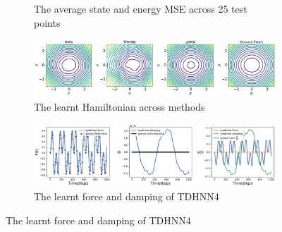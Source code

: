 \documentclass[twoside]{article}
\begin{document}
\begin{figure}[!htb]
\begin{subfigure}[b]{0.48\textwidth}
\caption{The average state and energy MSE across 25 test points}
\end{subfigure}
\begin{subfigure}[b]{0.48\textwidth}
\includegraphics[width=\textwidth]{figures/figures/forced_mass_spring/2/forced_mass_spring_hamiltonian_0.pdf}
\caption{The learnt Hamiltonian across methods}
\end{subfigure}
\begin{subfigure}[b]{0.48\textwidth}
\includegraphics[width=\textwidth]{figures/figures/forced_mass_spring/2/forced_mass_spring_dpdt_0.pdf}
\caption{The learnt force and damping of TDHNN4}
\end{subfigure}
\label{forced_mpsring_2_full}
\end{figure}
\end{document}
